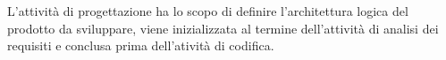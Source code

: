 L'attivit\`{a} di progettazione ha lo scopo di definire l'architettura logica del prodotto da sviluppare, viene inizializzata al termine dell'attivit\`{a} di analisi dei requisiti e conclusa prima dell'ativit\`{a} di codifica. 
